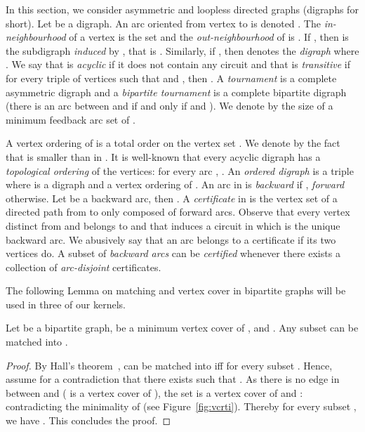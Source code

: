

In this section, we consider asymmetric and loopless directed graphs (digraphs for short). Let  be a digraph. An arc oriented from vertex  to  is denoted . The \emph{in-neighbourhood} of a vertex  is the set  and the \emph{out-neighbourhood} of  is . If , then  is the subdigraph \emph{induced} by , that is . Similarly, if , then  denotes the \emph{digraph} where . We say that  is \emph{acyclic} if it does not contain any circuit and that  is \emph{transitive} if for every triple of vertices  such that  and , then . A \emph{tournament}  is a complete asymmetric digraph and a \emph{bipartite tournament}  is a complete bipartite digraph (there is an arc between  and  if and only if  and ). We denote by  the size of a minimum feedback arc set of .

A vertex ordering  of  is a total order on the vertex set . We denote by  the fact that  is smaller than  in . It is well-known that every acyclic digraph has a \emph{topological ordering}  of the vertices: for every arc , . An \emph{ordered digraph} is a triple  where  is a digraph and  a vertex ordering of . An arc  in  is \emph{backward} if , \emph{forward} otherwise. Let  be a backward arc, then . A \emph{certificate}  in  is the vertex set of a directed path from  to  only composed of forward arcs. Observe that every vertex  distinct from  and  belongs to  and that  induces a circuit in which  is the unique backward arc. We abusively say that an arc  belongs to a certificate if its two vertices do. A subset  of \emph{backward arcs} can be \emph{certified} whenever there exists a collection  of \emph{arc-disjoint} certificates.


The following Lemma on matching and vertex cover in bipartite graphs will be used in three of our kernels.

\begin{lemma} \label{lem:matching}
Let  be a bipartite graph,  be a minimum vertex cover of ,  and . Any subset  can be matched into . 
\end{lemma}
\begin{proof}
By Hall's theorem~\cite{H35},  can be matched into  iff  for every subset . Hence, assume for a contradiction that there exists  such that . As there is no edge in  between  and  ( is a vertex cover of ), the set  is a vertex cover of  and : contradicting the minimality of  (see Figure~\ref{fig:vcrti}). Thereby for every subset , we have . This concludes the proof.  
\end{proof}

